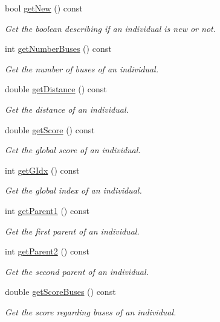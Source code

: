 \begin{DoxyCompactItemize}
bool \hyperlink{class_individu_a64b1dae7754d35a424866f2a6fedac6e}{get\+New} () const
\begin{DoxyCompactList}\small\item\em Get the boolean describing if an individual is new or not. \end{DoxyCompactList}\item 
int \hyperlink{class_individu_a33a6c22bc7e08d2fe32664be076b3957}{get\+Number\+Buses} () const
\begin{DoxyCompactList}\small\item\em Get the number of buses of an individual. \end{DoxyCompactList}\item 
double \hyperlink{class_individu_a658da48a9ad9a057f5c05176c1bf4049}{get\+Distance} () const
\begin{DoxyCompactList}\small\item\em Get the distance of an individual. \end{DoxyCompactList}\item 
double \hyperlink{class_individu_acbbbfb9528094739f13041dbbe82c989}{get\+Score} () const
\begin{DoxyCompactList}\small\item\em Get the global score of an individual. \end{DoxyCompactList}\item 
int \hyperlink{class_individu_acb09f4a7219773933b9261be41e6e0e7}{get\+G\+Idx} () const
\begin{DoxyCompactList}\small\item\em Get the global index of an individual. \end{DoxyCompactList}\item 
int \hyperlink{class_individu_aa20d31fdd48f0672fcc5bbc831b96fd3}{get\+Parent1} () const
\begin{DoxyCompactList}\small\item\em Get the first parent of an individual. \end{DoxyCompactList}\item 
int \hyperlink{class_individu_a194ba789e23ae0b59491681e91115609}{get\+Parent2} () const
\begin{DoxyCompactList}\small\item\em Get the second parent of an individual. \end{DoxyCompactList}\item 
double \hyperlink{class_individu_a2ff6f8c293a8794bce32391f5ed3c470}{get\+Score\+Buses} () const
\begin{DoxyCompactList}\small\item\em Get the score regarding buses of an individual. \end{DoxyCompactList}\item 

\end{DoxyCompactItemize}
